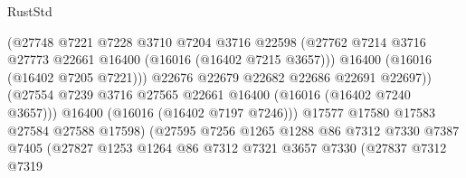 \begin{lexlean}{RustStd}
\begin{coremodule}
                                        (@27748
                                          @7221
                                          @7228
                                          @3710
                                          @7204
                                          @3716
                                          @22598
                                          (@27762
                                            @7214
                                            @3716
                                            @27773
                                            @22661
                                            @16400
                                            (@16016 (@16402 @7215 @3657)))
                                          @16400
                                          (@16016 (@16402 @7205 @7221)))
                                        @22676
                                        @22679
                                        @22682
                                        @22686
                                        @22691
                                        @22697))
                                    (@27554
                                      @7239
                                      @3716
                                      @27565
                                      @22661
                                      @16400
                                      (@16016 (@16402 @7240 @3657)))
                                    @16400
                                    (@16016 (@16402 @7197 @7246)))
                                  @17577
                                  @17580
                                  @17583
                                  @27584
                                  @27588
                                  @17598)
                                (@27595
                                  @7256
                                  @1265
                                  @1288
                                  @86
                                  @7312
                                  @7330
                                  @7387
                                  @7405
                                  (@27827
                                    @1253
                                    @1264
                                    @86
                                    @7312
                                    @7321
                                    @3657
                                    @7330
                                    (@27837
                                      @7312
                                      @7319

\end{coremodule}
\end{lexlean}
